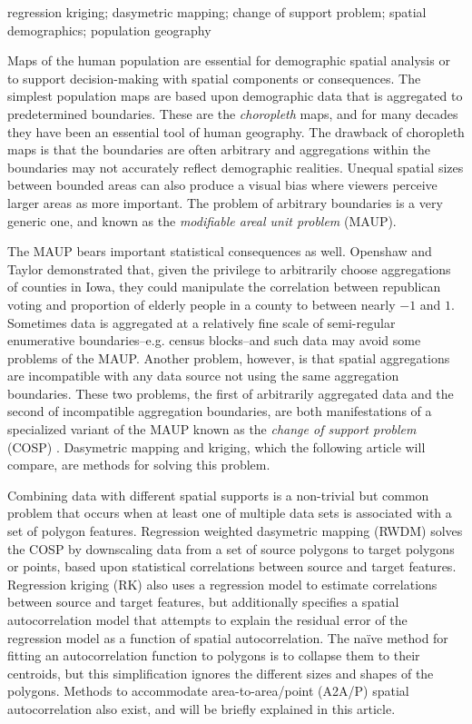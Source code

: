 \documentclass[]{interact}
\theoremstyle{plain}%
\theoremstyle{definition}
\theoremstyle{remark}
\begin{document}
\begin{keywords}
  regression kriging; dasymetric mapping; change of support problem; spatial demographics; population geography
\end{keywords}


Maps of the human population are essential for demographic spatial analysis or to support decision-making with spatial components or consequences.  The simplest population maps are based upon demographic data that is aggregated to predetermined boundaries.  These are the {\em choropleth} maps, and for many decades they have been an essential tool of human geography.  The drawback of choropleth maps is that the boundaries are often arbitrary and aggregations within the boundaries may not accurately reflect demographic realities.  Unequal spatial sizes between bounded areas can also produce a visual bias where viewers perceive larger areas as more important.  The problem of arbitrary boundaries is a very generic one, and known as the {\em modifiable areal unit problem} (MAUP).

The MAUP bears important statistical consequences as well.  Openshaw and Taylor \cite{openshaw79} demonstrated that, given the privilege to arbitrarily choose aggregations of counties in Iowa, they could manipulate the correlation between republican voting and proportion of elderly people in a county to between nearly $-1$ and $1$.  Sometimes data is aggregated at a relatively fine scale of semi-regular enumerative boundaries--e.g. census blocks--and such data may avoid some problems of the MAUP.  Another problem, however, is that spatial aggregations are incompatible with any data source not using the same aggregation boundaries.  These two problems, the first of arbitrarily aggregated data and the second of incompatible aggregation boundaries, are both manifestations of a specialized variant of the MAUP known as the {\em change of support problem} (COSP) \citep{cressie96, gelfand01}.  Dasymetric mapping and kriging, which the following article will compare, are methods for solving this problem.

Combining data with different spatial supports is a non-trivial but common problem that occurs when at least one of multiple data sets is associated with a set of polygon features.  Regression weighted dasymetric mapping (RWDM) solves the COSP by downscaling data from a set of source polygons to target polygons or points, based upon statistical correlations between source and target features.  Regression kriging (RK) also uses a regression model to estimate correlations between source and target features, but additionally specifies a spatial autocorrelation model that attempts to explain the residual error of the regression  model as a function of spatial autocorrelation.  The na\"{i}ve method for fitting an autocorrelation function to polygons is to collapse them to their centroids, but this simplification ignores the different sizes and shapes of the polygons.  Methods to accommodate area-to-area/point (A2A/P) spatial autocorrelation also exist, and will be briefly explained in this article.
\end{document}
